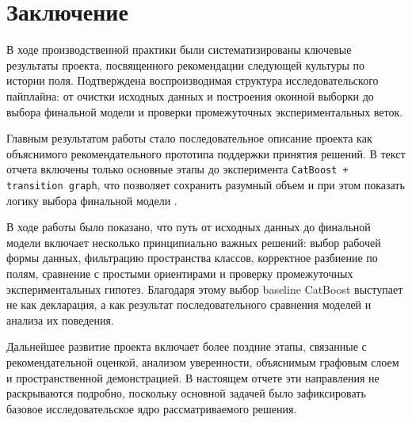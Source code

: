 \section{Заключение}

В ходе производственной практики были систематизированы ключевые результаты проекта, посвященного рекомендации следующей культуры по истории поля. Подтверждена воспроизводимая структура исследовательского пайплайна: от очистки исходных данных и построения оконной выборки до выбора финальной модели и проверки промежуточных экспериментальных веток.

Главным результатом работы стало последовательное описание проекта как объяснимого рекомендательного прототипа поддержки принятия решений. В текст отчета включены только основные этапы до эксперимента \texttt{CatBoost + transition graph}, что позволяет сохранить разумный объем и при этом показать логику выбора финальной модели \FinalModel{}.

В ходе работы было показано, что путь от исходных данных до финальной модели включает несколько принципиально важных решений: выбор рабочей формы данных, фильтрацию пространства классов, корректное разбиение по полям, сравнение с простыми ориентирами и проверку промежуточных экспериментальных гипотез. Благодаря этому выбор baseline CatBoost выступает не как декларация, а как результат последовательного сравнения моделей и анализа их поведения.

Дальнейшее развитие проекта включает более поздние этапы, связанные с рекомендательной оценкой, анализом уверенности, объяснимым графовым слоем и пространственной демонстрацией. В настоящем отчете эти направления не раскрываются подробно, поскольку основной задачей было зафиксировать базовое исследовательское ядро рассматриваемого решения.
